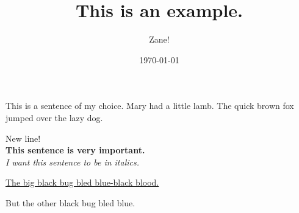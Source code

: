 \documentclass{article}
\title{This is an example.}
\author{Zane!}
\date{\today}
\begin{document}
\maketitle

This is a sentence of my choice. Mary had a little lamb. The    quick brown fox jumped over the lazy dog. \\ \vspace{1in} %

New \hspace{7cm} line! \\

\textbf{This sentence is very important.} \\

\textit{I want this sentence to be in italics.}

\underline{The big black bug bled blue-black blood.}

\begin{center}
    But the other black bug bled blue.
\end{center}
\end{document}
